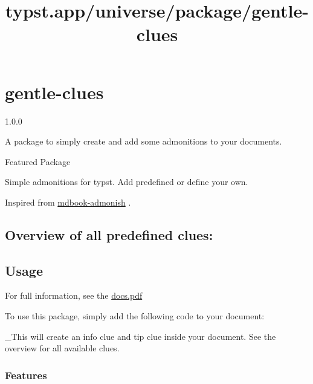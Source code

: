 \title{typst.app/universe/package/gentle-clues}

\label{banner}
\section{gentle-clues}\label{gentle-clues}

{ 1.0.0 }

A package to simply create and add some admonitions to your documents.

{ } Featured Package

\label{readme}
Simple admonitions for typst. Add predefined or define your own.

Inspired from
\href{https://tommilligan.github.io/mdbook-admonish/}{mdbook-admonish} .

\subsection{Overview of all predefined
clues:}\label{overview-of-all-predefined-clues}

\pandocbounded{}

\subsection{Usage}\label{usage}

For full information, see the
\href{https://github.com/jomaway/typst-gentle-clues/blob/main/docs.pdf}{docs.pdf}

To use this package, simply add the following code to your document:

\begin{Shaded}
\begin{Highlighting}[]


\end{Highlighting}
\end{Shaded}

\_This will create an info clue and tip clue inside your document. See
the overview for all available clues.

\subsubsection{Features}\label{features}

